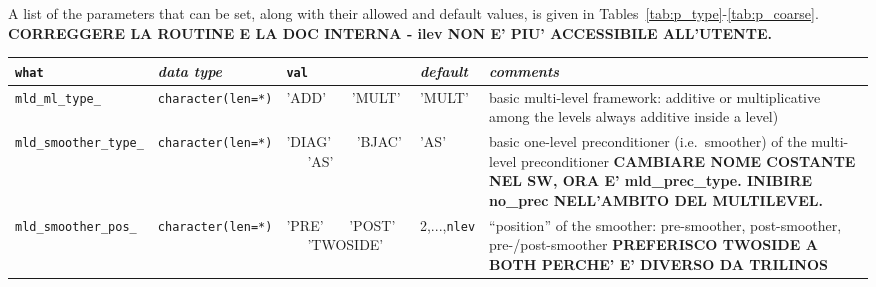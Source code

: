 A list of the parameters that can be set, along with their allowed and
default values, is given in Tables~\ref{tab:p_type}-\ref{tab:p_coarse}. 
\textbf{CORREGGERE LA ROUTINE E LA DOC INTERNA - ilev NON E' PIU'
ACCESSIBILE ALL'UTENTE.}


\begin{sidewaystable}
\begin{center}
\begin{tabular}{|l|l|p{2cm}|l|p{7cm}|}
\hline
\verb|what|              & \emph{data type}        &  \verb|val|      &  \emph{default}  &
\emph{comments} \\ \hline
\verb|mld_ml_type_|      & \verb|character(len=*)|
                         & 'ADD' \ \ \ 'MULT'   
                         & 'MULT'
                         & basic multi-level framework: additive or multiplicative
                           among the levels always additive inside a level)         \\  
\verb|mld_smoother_type_|& \verb|character(len=*)|
                         & 'DIAG' \ \ \ 'BJAC' \ \ \ 'AS'
                         & 'AS'
                         & basic one-level preconditioner (i.e.\ smoother) of the
                           multi-level preconditioner
                           \textbf{CAMBIARE NOME COSTANTE NEL SW, ORA E'
                           mld\_prec\_type. INIBIRE no\_prec NELL'AMBITO DEL
                           MULTILEVEL.}                                 \\
\verb|mld_smoother_pos_| & \verb|character(len=*)|
                         & 'PRE' \ \ \ 'POST' \ \ \ 'TWOSIDE'
                         & 2,...,\verb|nlev|
                         & ``position'' of the smoother: pre-smoother, post-smoother, 
                           pre-/post-smoother \textbf{PREFERISCO TWOSIDE A BOTH
                           PERCHE' E' DIVERSO DA TRILINOS} \\
\hline
\end{tabular}
\end{center}
\caption{Parameters defining the type of multi-level preconditioner.
\label{tab:p_type}}                       
\end{sidewaystable}
                   
